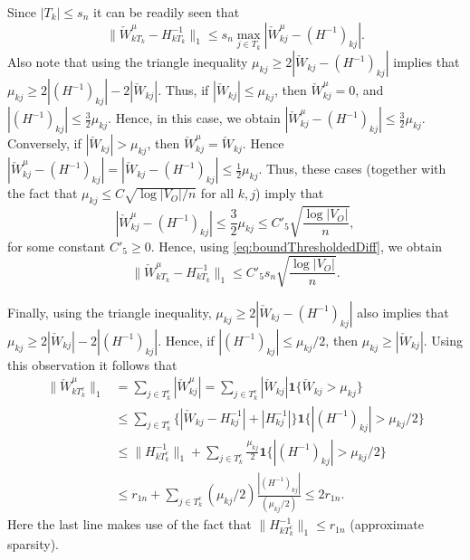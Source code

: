 \documentclass[opre,nonblindrev]{informs3} %
\begin{document}
\begin{APPENDIX}{}
Since $|T_k| \leq s_n$ it
can be readily seen that
\begin{equation} \label{eq:boundThresholdedDiff}
\| \check W_{k T_k}^\mu - H^{-1}_{kT_k} \|_1 \leq s_n \max_{j\in T_k} |\check W_{kj}^\mu-(H^{-1})_{kj}|.
\end{equation}
Also note that using the triangle inequality $\mu_{kj}\geq 2 |\check W_{kj} -(H^{-1})_{kj}|$ implies that $\mu_{kj}\geq  2|(H^{-1})_{kj}|-2 |\check W_{kj}|$.
Thus, if $|\check W_{kj}|\leq \mu_{kj}$, then $\check W_{kj}^\mu=0$, and $|(H^{-1})_{kj}| \leq \frac{3}{2} \mu_{kj}$. Hence, in this case, we obtain
$|\check W_{kj}^\mu-(H^{-1})_{kj}|\leq \frac{3}{2} \mu_{kj}$.
Conversely, if $|\check W_{kj}|> \mu_{kj}$, then $\check W_{kj}^\mu= \check W_{kj}$. Hence $|\check W_{kj}^\mu-(H^{-1})_{kj}|= |\check W_{kj}-(H^{-1})_{kj}|\leq \frac{1}{2} \mu_{kj}$.
Thus,
these cases (together
with the fact that
$\mu_{kj}\leq C \sqrt{\log|V_O|/n}$ for all $k,j$) imply that
\begin{equation}\label{eq:boundCheckWDiff}
|\check W_{kj}^\mu-(H^{-1})_{kj}| \leq \frac{3}{2} \mu_{kj}\leq C'_5 \sqrt{\frac{\log|V_O|}{n}},
\end{equation}
for some constant $C'_5 \geq 0$.
Hence, using
\eqref{eq:boundThresholdedDiff}, we obtain
\begin{equation}\label{eq:Thm1LastBound2}
\| \check W_{k T_k}^\mu - H^{-1}_{kT_k} \|_1 \leq C'_5 s_n  \sqrt{\frac{\log |V_O|}{n}}.
\end{equation}%

Finally, using the triangle inequality,
$\mu_{kj}\geq 2 |\check W_{kj} -(H^{-1})_{kj}|$ also implies that $\mu_{kj}\geq 2 |\check W_{kj}|- 2|(H^{-1})_{kj}|$.
Hence, if  $|(H^{-1})_{kj}|\leq  \mu_{kj}/2$, then $\mu_{kj} \geq |\check W_{kj}|$.
Using this observation it follows that
\begin{equation}\label{eq:Thm1LastBound3}
\begin{aligned}
\| \check W_{k T_k^c}^\mu\|_1 &=\sum_{j \in T_k^c} |\check W_{k j}^\mu| =  \sum_{j \in T_k^c} |\check W_{k j}| \mathbf{1}\{ \check W_{k j}>\mu_{kj} \} \\
& \leq \sum_{j \in T_k^c} \{|\check W_{kj}-H^{-1}_{kj}| + |H^{-1}_{kj}|\} \mathbf{1}\{|(H^{-1})_{kj}|> \mu_{kj}/2\} \\
& \leq \|H^{-1}_{kT_k^c}\|_1 +  \sum_{j \in T_k^c} \frac{\mu_{kj}}{2} \mathbf{1}\{|(H^{-1})_{kj}|> \mu_{kj}/2\} \\
& \leq r_{1n} +  \sum_{j \in T_k^c} (\mu_{kj}/2) \frac{|(H^{-1})_{kj}|}{(\mu_{kj}/2)} \leq 2r_{1n}.
\end{aligned}
\end{equation}
Here the last line makes use of the fact that $\|H^{-1}_{kT_k^c}\|_1 \leq r_{1n}$ (approximate sparsity).


\end{APPENDIX}
\end{document}
